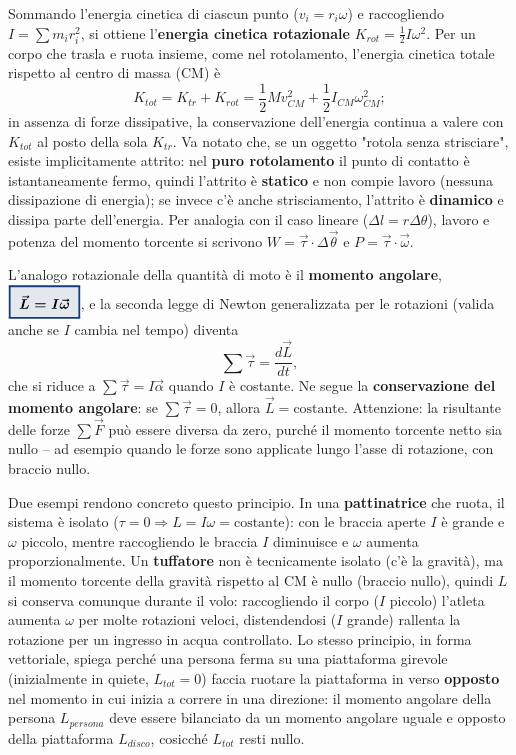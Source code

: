 \documentclass[a4paper,11pt]{article}
\newcommand{\keyeq}[1]{{\setlength{\fboxsep}{6pt}\setlength{\fboxrule}{1.3pt}\fcolorbox{chapblue}{chapblue!12}{\boldmath$\displaystyle #1$}}}
\begin{document}
Sommando l'energia cinetica di ciascun punto ($v_i=r_i\omega$) e raccogliendo $I=\sum m_ir_i^2$, si ottiene l'\textbf{energia cinetica rotazionale} $K_{rot}=\frac12I\omega^2$. Per un corpo che trasla e ruota insieme, come nel rotolamento, l'energia cinetica totale rispetto al centro di massa (CM) è
\[
K_{tot} = K_{tr}+K_{rot} = \frac12 Mv_{CM}^2 + \frac12 I_{CM}\omega_{CM}^2;
\]
in assenza di forze dissipative, la conservazione dell'energia continua a valere con $K_{tot}$ al posto della sola $K_{tr}$. Va notato che, se un oggetto "rotola senza strisciare", esiste implicitamente attrito: nel \textbf{puro rotolamento} il punto di contatto è istantaneamente fermo, quindi l'attrito è \textbf{statico} e non compie lavoro (nessuna dissipazione di energia); se invece c'è anche strisciamento, l'attrito è \textbf{dinamico} e dissipa parte dell'energia. Per analogia con il caso lineare ($\Delta l=r\Delta\theta$), lavoro e potenza del momento torcente si scrivono $W=\vec\tau\cdot\Delta\vec\theta$ e $P=\vec\tau\cdot\vec\omega$.

L'analogo rotazionale della quantità di moto è il \textbf{momento angolare}, $\keyeq{\vec L=I\vec\omega}$, e la seconda legge di Newton generalizzata per le rotazioni (valida anche se $I$ cambia nel tempo) diventa
\[
\sum\vec\tau = \frac{d\vec L}{dt},
\]
che si riduce a $\sum\vec\tau=I\vec\alpha$ quando $I$ è costante. Ne segue la \textbf{conservazione del momento angolare}: se $\sum\vec\tau=0$, allora $\vec L=\text{costante}$. Attenzione: la risultante delle forze $\sum\vec F$ può essere diversa da zero, purché il momento torcente netto sia nullo -- ad esempio quando le forze sono applicate lungo l'asse di rotazione, con braccio nullo.

Due esempi rendono concreto questo principio. In una \textbf{pattinatrice} che ruota, il sistema è isolato ($\tau=0\Rightarrow L=I\omega=\text{costante}$): con le braccia aperte $I$ è grande e $\omega$ piccolo, mentre raccogliendo le braccia $I$ diminuisce e $\omega$ aumenta proporzionalmente. Un \textbf{tuffatore} non è tecnicamente isolato (c'è la gravità), ma il momento torcente della gravità rispetto al CM è nullo (braccio nullo), quindi $L$ si conserva comunque durante il volo: raccogliendo il corpo ($I$ piccolo) l'atleta aumenta $\omega$ per molte rotazioni veloci, distendendosi ($I$ grande) rallenta la rotazione per un ingresso in acqua controllato. Lo stesso principio, in forma vettoriale, spiega perché una persona ferma su una piattaforma girevole (inizialmente in quiete, $L_{tot}=0$) faccia ruotare la piattaforma in verso \textbf{opposto} nel momento in cui inizia a correre in una direzione: il momento angolare della persona $L_{persona}$ deve essere bilanciato da un momento angolare uguale e opposto della piattaforma $L_{disco}$, cosicché $L_{tot}$ resti nullo.
\end{document}
